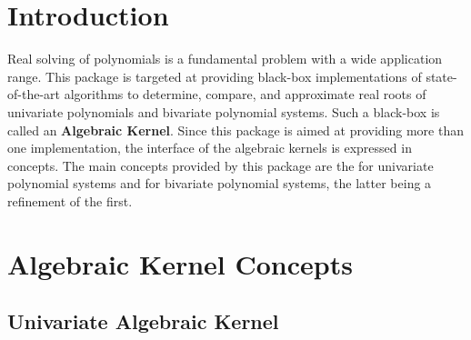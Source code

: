 \section{Introduction}
Real solving of polynomials is a fundamental problem with a wide application range. 
This package is targeted at providing black-box implementations of state-of-the-art 
algorithms to determine, compare, and approximate real roots of univariate polynomials
and bivariate polynomial systems. Such a black-box is called an {\bf Algebraic Kernel}. 
Since this package is aimed at providing more than one implementation, the interface of 
the algebraic kernels is expressed in concepts. The main concepts provided by this package are the 
 for univariate polynomial systems and  
for bivariate polynomial systems, the latter being a refinement of the first. 





\section{Algebraic Kernel Concepts}
\subsection{Univariate Algebraic Kernel}
